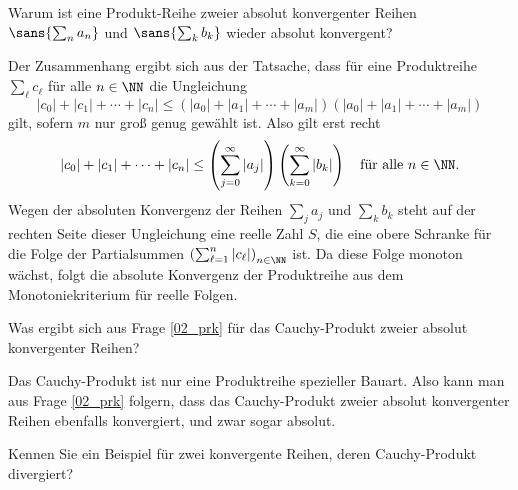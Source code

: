 \smallskip
\begin{frage}\label{02_prk}
  Warum ist eine Produkt-Reihe zweier absolut konvergenter Reihen 
  $\sans{\sum_n a_n}$ und $\sans{\sum_k b_k}$ wieder absolut konvergent?
\end{frage}

\begin{antwort}
  Der Zusammenhang ergibt sich aus der Tatsache, dass für 
  eine Produktreihe $\sum_\ell c_\ell$ für alle $n\in\NN$ die Ungleichung 
  \[
  |c_0|+ |c_1| + \cdots + |c_n| \le (|a_0|+|a_1|+\cdots + |a_m| )
  (|a_0|+|a_1|+\cdots + |a_m| )
  \]
  gilt, sofern $m$ nur groß genug gewählt ist. Also gilt erst recht 
  \[
  |c_0|+ |c_1| + \cdots + |c_n| \le 
  \left( \sum_{j=0}^\infty |a_j| \right) 
  \left( \sum_{k=0}^\infty |b_k| \right)  
  \quad\text{für alle $n\in \NN$.}
  \]
  Wegen der absoluten Konvergenz der Reihen $\sum_j a_j$ und 
  $\sum_k b_k$ steht auf der rechten Seite dieser Ungleichung eine 
  reelle Zahl $S$, die eine obere Schranke für die Folge der 
  Partialsummen $\left(\sum_{\ell=1}^n |c_\ell|\right)_{n\in\NN}$ ist. 
  Da diese Folge monoton wächst, 
  folgt die absolute Konvergenz der Produktreihe 
  aus dem Monotoniekriterium für reelle Folgen. \AntEnd 
\end{antwort}

\smallskip
\begin{frage}\label{02_cpk}
  Was ergibt sich aus Frage \ref{02_prk} 
  für das Cauchy-Produkt zweier absolut konvergenter Reihen?
\end{frage}

\begin{antwort}
  Das Cauchy-Produkt ist nur eine Produktreihe spezieller Bauart. 
  Also kann man aus Frage \ref{02_prk}
  folgern, dass das Cauchy-Produkt zweier absolut konvergenter 
  Reihen ebenfalls konvergiert, und zwar sogar absolut.
  \AntEnd
\end{antwort}

\begin{frage}\label{02_cpd}
  Kennen Sie ein Beispiel für zwei konvergente Reihen, deren Cauchy-Produkt 
  divergiert?
\end{frage}

